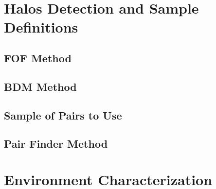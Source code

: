 \section{Halos Detection and Sample Definitions}
\label{sec:HalosDetectionAndSampleDefinitions}


	\subsection{FOF Method}
	\label{subsec:FOFMethod}


	\subsection{BDM Method}
	\label{subsec:BDMMethod}
	
	
	\subsection{Sample of Pairs to Use}
	\label{subsec:SampleOfPairsToUse}
	
	
	\subsection{Pair Finder Method}
	\label{subsec:PairFinderMethod}






\section{Environment Characterization}
\label{sec:EnvironmentCharacterization}


